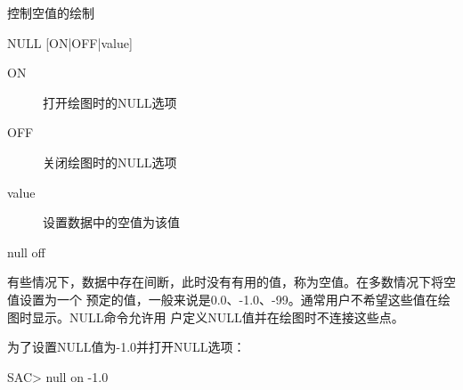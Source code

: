 \label{cmd:null}

控制空值的绘制

\begin{SACSTX}
NULL [ON|OFF|value]
\end{SACSTX}

\begin{description}
\item [ON] 打开绘图时的NULL选项
\item [OFF] 关闭绘图时的NULL选项
\item [value] 设置数据中的空值为该值
\end{description}

\begin{SACDFT}
null off
\end{SACDFT}

有些情况下，数据中存在间断，此时没有有用的值，称为空值。在多数情况下将空值设置为一个
预定的值，一般来说是0.0、-1.0、-99。通常用户不希望这些值在绘图时显示。NULL命令允许用
户定义NULL值并在绘图时不连接这些点。

为了设置NULL值为-1.0并打开NULL选项：
\begin{SACCode}
SAC> null on -1.0
\end{SACCode}
